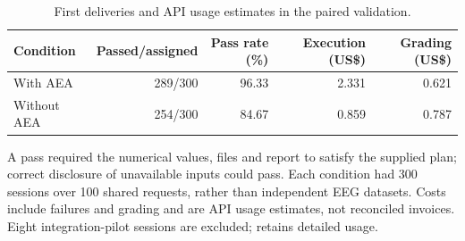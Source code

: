\begin{table}[!htbp]
\centering\small
\caption{First deliveries and API usage estimates in the paired validation.}
\label{tab:paired-validation}
\begin{tabular}{lrrrr}
\toprule
Condition & Passed/assigned & Pass rate (\%) & Execution (US\$) & Grading (US\$) \\
\midrule
With AEA & 289/300 & 96.33 & 2.331 & 0.621 \\
Without AEA & 254/300 & 84.67 & 0.859 & 0.787 \\
\bottomrule
\end{tabular}
\par\smallskip
\begin{minipage}{\linewidth}\footnotesize
A pass required the numerical values, files and report to satisfy the supplied plan; correct disclosure of unavailable inputs could pass. Each condition had 300 sessions over 100 shared requests, rather than independent EEG datasets. Costs include failures and grading and are API usage estimates, not reconciled invoices. Eight integration-pilot sessions are excluded;  retains detailed usage.

\end{minipage}
\end{table}
